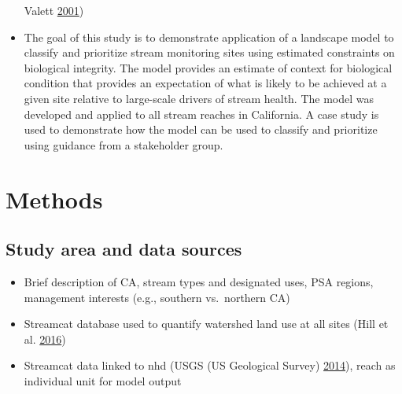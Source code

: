 \documentclass[]{article}
\begin{document}
\begin{itemize}
  Valett \protect\hyperlink{ref-Sponseller01}{2001})
\item
  The goal of this study is to demonstrate application of a landscape
  model to classify and prioritize stream monitoring sites using
  estimated constraints on biological integrity. The model provides an
  estimate of context for biological condition that provides an
  expectation of what is likely to be achieved at a given site relative
  to large-scale drivers of stream health. The model was developed and
  applied to all stream reaches in California. A case study is used to
  demonstrate how the model can be used to classify and prioritize using
  guidance from a stakeholder group.
\end{itemize}

\section{Methods}\label{methods}

\subsection{Study area and data
sources}\label{study-area-and-data-sources}

\begin{itemize}
\item
  Brief description of CA, stream types and designated uses, PSA
  regions, management interests (e.g., southern vs.~northern CA)
\item
  Streamcat database used to quantify watershed land use at all sites
  (Hill et al. \protect\hyperlink{ref-Hill16}{2016})
\item
  Streamcat data linked to \ac{nhd} (USGS (US Geological Survey)
  \protect\hyperlink{ref-USGS14}{2014}), reach as individual unit for
  model output
\end{itemize}
\end{document}
